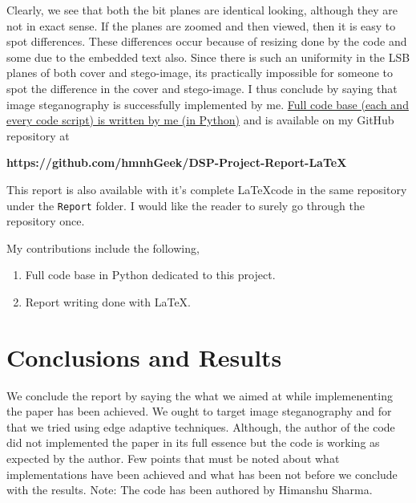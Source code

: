 \documentclass{report}
\begin{document}
Clearly, we see that both the bit planes are identical looking, although they are not in exact sense. If the planes are zoomed and then viewed, then it is easy to spot differences. These differences occur because of resizing done by the code and some due to the embedded text also. Since there is such an uniformity in the LSB planes of both cover and stego-image, its practically impossible for someone to spot the difference in the cover and stego-image. I thus conclude by saying that image steganography is successfully implemented by me. \underline{Full code base (each and every code script) is written by me (in Python)} and is  available on my GitHub repository at \begin{center} {\bf https://github.com/hmnhGeek/DSP-Project-Report-LaTeX} \end{center}
This report is also available with it's complete \LaTeX code in the same repository under the \texttt{Report} folder. I would like the reader to surely go through the repository once.

\par My contributions include the following,
\begin{enumerate}
\item Full code base in Python dedicated to this project.
\item Report writing done with \LaTeX. 
\end{enumerate}


\section{Conclusions and Results}
We conclude the report by saying the what we aimed at while implemenenting the paper has been achieved. We ought to target image steganography and for that we tried using edge adaptive techniques. Although, the author of the code did not implemented the paper in its full essence but the code is working as expected by the author. Few points that must be noted about what implementations have been achieved and what has been not before we conclude with the results. Note: The code has been authored by Himanshu Sharma. \\
\end{document}
